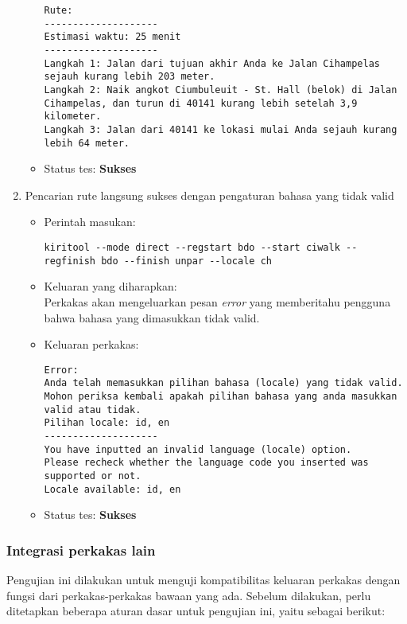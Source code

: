 \begin{enumerate}
\begin{itemize}
\begin{lstlisting}
Rute:
--------------------
Estimasi waktu: 25 menit
--------------------
Langkah 1: Jalan dari tujuan akhir Anda ke Jalan Cihampelas sejauh kurang lebih 203 meter.
Langkah 2: Naik angkot Ciumbuleuit - St. Hall (belok) di Jalan Cihampelas, dan turun di 40141 kurang lebih setelah 3,9 kilometer.
Langkah 3: Jalan dari 40141 ke lokasi mulai Anda sejauh kurang lebih 64 meter.
		\end{lstlisting}
		\item Status tes: \textbf{Sukses}
	\end{itemize}
	
	\item Pencarian rute langsung sukses dengan pengaturan bahasa yang tidak valid
	\begin{itemize}
		\item Perintah masukan:
		\begin{lstlisting}
kiritool --mode direct --regstart bdo --start ciwalk --regfinish bdo --finish unpar --locale ch
		\end{lstlisting}
		\item Keluaran yang diharapkan: \\
		Perkakas akan mengeluarkan pesan \textit{error} yang memberitahu pengguna bahwa bahasa yang dimasukkan tidak valid.
		\item Keluaran perkakas:
		\begin{lstlisting}
Error:
Anda telah memasukkan pilihan bahasa (locale) yang tidak valid.
Mohon periksa kembali apakah pilihan bahasa yang anda masukkan valid atau tidak.
Pilihan locale: id, en
--------------------
You have inputted an invalid language (locale) option.
Please recheck whether the language code you inserted was supported or not.
Locale available: id, en
		\end{lstlisting}
		\item Status tes: \textbf{Sukses}
	\end{itemize}
	
\end{enumerate}

\subsubsection{Integrasi perkakas \cl lain}
\label{sec:testing-experiments-testing-integration}

Pengujian ini dilakukan untuk menguji kompatibilitas keluaran perkakas dengan fungsi dari perkakas-perkakas \cl bawaan yang ada. Sebelum dilakukan, perlu ditetapkan beberapa aturan dasar untuk pengujian ini, yaitu sebagai berikut:

